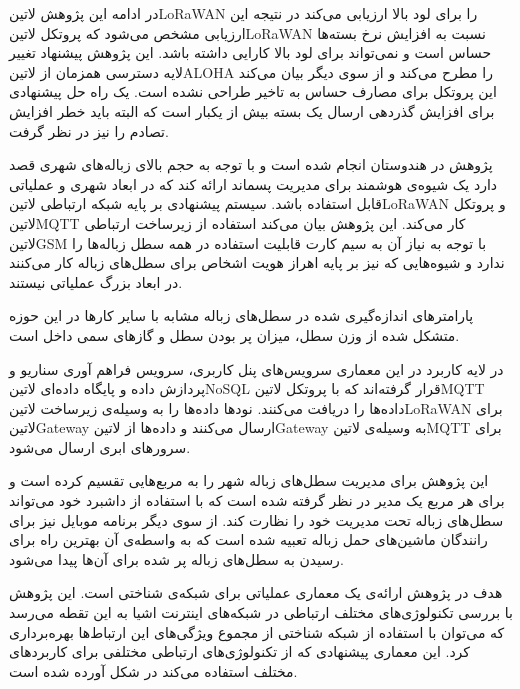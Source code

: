 در ادامه این پژوهش ‌لاتین{LoRaWAN} را برای لود بالا ارزیابی می‌کند در نتیجه این ارزیابی مشخص می‌شود که پروتکل ‌لاتین{LoRaWAN} نسبت به افزایش نرخ بسته‌ها حساس است و نمی‌تواند برای لود بالا کارایی داشته باشد.
این پژوهش پیشنهاد تغییر لایه دسترسی همزمان از ‌لاتین{ALOHA} را مطرح می‌کند و از سوی دیگر بیان می‌کند این پروتکل برای مصارف حساس به تاخیر طراحی نشده است. یک راه حل پیشنهادی برای افزایش گذردهی ارسال یک بسته
بیش از یکبار است که البته باید خطر افزایش تصادم را نیز در نظر گرفت.


پژوهش  در هندوستان انجام شده است و با توجه به حجم بالای زباله‌های شهری قصد دارد یک شیوه‌ی هوشمند برای مدیریت پسماند ارائه کند که در ابعاد شهری و عملیاتی قابل استفاده باشد.
سیستم پیشنهادی بر پایه شبکه ارتباطی ‌لاتین{LoRaWAN} و پروتکل ‌لاتین{MQTT} کار می‌کند. این پژوهش بیان می‌کند استفاده از زیرساخت ارتباطی ‌لاتین{GSM} با توجه به نیاز آن به سیم کارت قابلیت
استفاده در همه سطل زباله‌ها را ندارد و شیوه‌هایی که نیز بر پایه اهراز هویت اشخاص برای سطل‌های زباله کار می‌کنند در ابعاد بزرگ عملیاتی نیستند.

پارامترهای اندازه‌گیری شده در سطل‌های زباله مشابه با سایر کارها در این حوزه متشکل شده از وزن سطل، میزان پر بودن سطل و گازهای سمی داخل است.

در لایه کاربرد در این معماری سرویس‌های پنل کاربری، سرویس فراهم آوری سناریو و پردازش داده و پایگاه داده‌ای ‌لاتین{NoSQL} قرار گرفته‌اند که با پروتکل ‌لاتین{MQTT} داده‌ها را دریافت می‌کنند.
نودها داده‌ها را به وسیله‌ی زیرساخت ‌لاتین{LoRaWAN} برای ‌لاتین{Gateway} ارسال می‌کنند و داده‌ها از ‌لاتین{Gateway} به وسیله‌ی ‌لاتین{MQTT} برای سرورهای ابری ارسال می‌شود.

این پژوهش برای مدیریت سطل‌های زباله شهر را به مربع‌هایی تقسیم کرده است و برای هر مربع یک مدیر در نظر گرفته شده است که با استفاده از داشبرد خود می‌تواند سطل‌های زباله تحت مدیریت خود را نظارت کند.
از سوی دیگر برنامه موبایل نیز برای رانندگان ماشین‌های حمل زباله تعبیه شده است که به واسطه‌ی آن بهترین راه برای رسیدن به سطل‌های زباله پر شده برای آن‌ها پیدا می‌شود.


هدف در پژوهش  ارائه‌ی یک معماری عملیاتی برای شبکه‌ی شناختی است. این پژوهش با بررسی تکنولوژی‌های مختلف ارتباطی در شبکه‌های اینترنت اشیا به این تقطه می‌رسد که می‌توان
با استفاده از شبکه شناختی از مجموع ویژگی‌های این ارتباط‌ها بهره‌برداری کرد. این معماری پیشنهادی که از تکنولوژی‌های ارتباطی مختلفی برای کاربردهای مختلف استفاده می‌کند در شکل 
آورده شده است.

